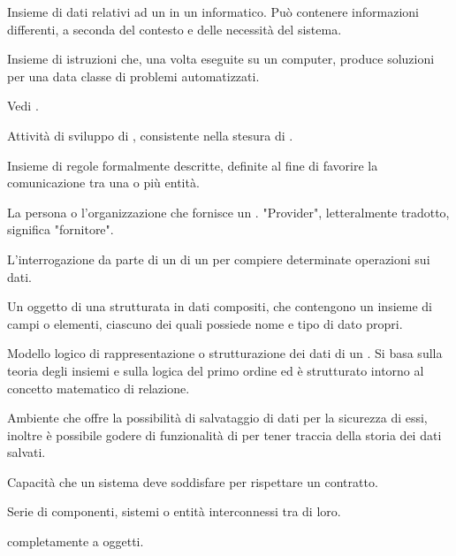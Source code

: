 {Insieme di dati relativi ad un  in un  informatico. Può contenere informazioni differenti, a seconda del contesto e delle necessità del sistema.}

{Insieme di istruzioni che, una volta eseguite su un computer, produce soluzioni per una data classe di problemi automatizzati.
}

{Vedi .}

{Attività di sviluppo di , consistente nella stesura di .
}

{Insieme di regole formalmente descritte, definite al fine di favorire la comunicazione tra una o più entità.
}

{La persona o l'organizzazione che fornisce un . "Provider", letteralmente tradotto, significa "fornitore".}


{L'interrogazione da parte di un  di un  per compiere determinate operazioni sui dati.
}


{Un oggetto di una  strutturata in dati compositi, che contengono un insieme di campi o elementi, ciascuno dei quali possiede nome e tipo di dato propri.}

{Modello logico di rappresentazione o strutturazione dei dati di un . Si basa sulla teoria degli insiemi e sulla logica del primo ordine ed è strutturato intorno al concetto matematico di relazione.}

{Ambiente che offre la possibilità di salvataggio di dati per la sicurezza di essi, inoltre è possibile godere di funzionalità di  per tener traccia della storia dei dati salvati.}

{Capacità che un sistema  deve soddisfare per rispettare un contratto.}

{Serie di componenti, sistemi o entità interconnessi tra di loro.}

{ completamente a oggetti.}


